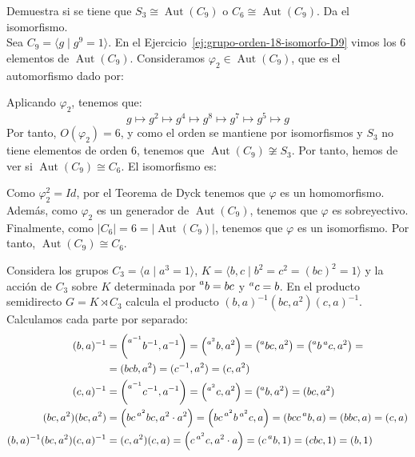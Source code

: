 \documentclass[12pt]{article}
\DeclareMathOperator{\Aut}{Aut}
\begin{document}
    \begin{ejercicio}
        Demuestra si se tiene que $S_3 \cong \Aut(C_9)$ o $C_6 \cong \Aut(C_9)$. Da el isomorfismo.\\

        Sea $C_9=\langle g\mid g^9=1\rangle$. En el Ejercicio~\ref{ej:grupo-orden-18-isomorfo-D9} vimos los $6$ elementos de $\Aut(C_9)$. Consideramos $\varphi_2\in \Aut(C_9)$, que es el automorfismo dado por:

        Aplicando $\varphi_2$, tenemos que:
        \begin{equation*}
            g \mapsto g^2 \mapsto g^4 \mapsto g^8 \mapsto g^7 \mapsto g^5 \mapsto g
        \end{equation*}
        Por tanto, $O(\varphi_2)=6$, y como el orden se mantiene por isomorfismos y $S_3$ no tiene elementos de orden $6$, tenemos que $\Aut(C_9)\not\cong S_3$. Por tanto, hemos de ver si $\Aut(C_9)\cong C_6$. El isomorfismo es:
        \Func{\varphi}{C_6}{\Aut(C_9)}{g}{\varphi_2}

        Como $\varphi_2^2=Id$, por el Teorema de Dyck tenemos que $\varphi$ es un homomorfismo. Además, como $\varphi_2$ es un generador de $\Aut(C_9)$, tenemos que $\varphi$ es sobreyectivo. Finalmente, como $|C_6|=6=|\Aut(C_9)|$, tenemos que $\varphi$ es un isomorfismo. Por tanto, $\Aut(C_9)\cong C_6$.
    \end{ejercicio}

    \begin{ejercicio}
        Considera los grupos $C_3 = \langle a\mid a^3 = 1\rangle$, $K = \langle b, c\mid b^2 = c^2 = (bc)^2 = 1\rangle$ y la acción de $C_3$ sobre $K$ determinada por $\prescript{a}{}{b} = bc$ y $\prescript{a}{}{c} = b$. En el producto semidirecto $G = K \rtimes C_3$ calcula el producto $(b, a)^{-1}(bc, a^2)(c, a)^{-1}$.\\

        Calculamos cada parte por separado:
        \begin{align*}
            (b, a)^{-1} & = \left(\prescript{a^{-1}}{}{b^{-1}}, a^{-1}\right) = \left(\prescript{a^2}{}{b}, a^2\right) = \left(\prescript{a}{}{bc}, a^2\right)
            = \left(\prescript{a}{}{b}\prescript{a}{}{c}, a^2\right) =\\&= (bcb, a^2)
            = (c^{-1}, a^2) = (c, a^2)\\
            (c, a)^{-1} & = \left(\prescript{a^{-1}}{}{c^{-1}}, a^{-1}\right) = \left(\prescript{a^2}{}{c}, a^2\right) = \left(\prescript{a}{}{b}, a^2\right)
            = (bc, a^2)\\
            (bc, a^2)(bc,a^2) & = \left(bc\prescript{a^2}{}{bc}, a^2\cdot a^2\right) = \left(bc\prescript{a^2}{}{b}\prescript{a^2}{}{c}, a\right)
            = \left(bcc\prescript{a}{}{b}, a\right) = \left(bbc, a\right) = (c,a)\\
            (b, a)^{-1}(bc, a^2)(c, a)^{-1} & = (c, a^2)(c, a) = \left(c\prescript{a^2}{}{c}, a^2\cdot a\right) = \left(c\prescript{a}{}{b}, 1\right)
            = (cbc, 1) = (b, 1)
        \end{align*}
    \end{ejercicio}
\end{document}
